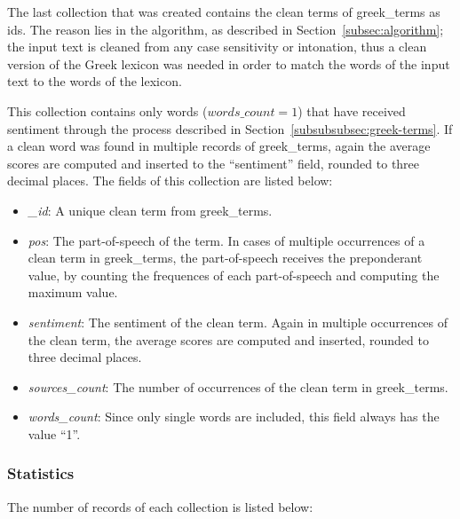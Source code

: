 \label{subsubsubsec:greek-sentiment-terms}

The last collection that was created
contains the clean terms of greek\_terms as ids.
The reason lies in the algorithm,
as described in Section~\ref{subsec:algorithm};
the input text is cleaned from any case sensitivity or intonation,
thus a clean version of the Greek lexicon was needed
in order to match the words of the input text to the words of the lexicon.

This collection contains only words ($words\_count = 1$)
that have received sentiment through the process
described in Section~\ref{subsubsubsec:greek-terms}.
If a clean word was found in multiple records of greek\_terms,
again the average scores are computed and inserted
to the ``sentiment'' field,
rounded to three decimal places.
The fields of this collection are listed below:

\begin{itemize}
 \item \emph{\_id}: A unique clean term from greek\_terms.
 
 \item \emph{pos}: The part-of-speech of the term.
 In cases of multiple occurrences of a clean term in greek\_terms,
 the part-of-speech receives the preponderant value,
 by counting the frequences of each part-of-speech
 and computing the maximum value.
 
 \item \emph{sentiment}: The sentiment of the clean term.
 Again in multiple occurrences of the clean term,
 the average scores are computed and inserted,
 rounded to three decimal places.
 
 \item \emph{sources\_count}: The number of occurrences
 of the clean term in greek\_terms.
 
 \item \emph{words\_count}: Since only single words are included,
 this field always has the value ``1''.
\end{itemize}

\subsubsection{Statistics}
\label{subsubsec:statistics}

The number of records of each collection is listed below:

